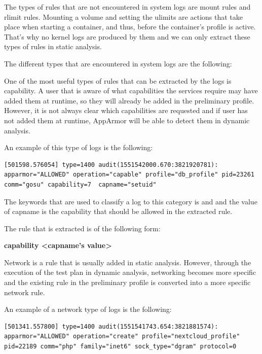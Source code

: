 The types of rules that are not encountered in system logs are mount rules and rlimit rules.  Mounting a volume and setting the ulimits are actions that take place when starting a container, and thus, before the container's profile is active. That's why no kernel logs are produced by them and we can only extract these types of rules in static analysis.

The different types that are encountered in system logs are the following:

\begin{description}[style=nextline]
\item[Capabilities]
One of the most useful types of rules that can be extracted by the logs is capability. A user that is aware of what capabilities the services require may have added them at runtime, so they will already be added in the preliminary profile. However, it is not always clear which capabilities are requested and if user has not added them at runtime, AppArmor will be able to detect them in dynamic analysis.

An example of this type of logs is the following:

\begin{lstlisting}[style=dockercommands]
[501598.576054] type=1400 audit(1551542000.670:3821920781): apparmor="ALLOWED" operation="capable" profile="db_profile" pid=23261 comm="gosu" capability=7  capname="setuid"
\end{lstlisting}

The keywords that are used to classify a log to this category is  and  and the value of capname is the capability that should be allowed in the extracted rule.

The rule that is extracted is of the following form:

\textbf{capability \textless capname's value\textgreater}

\item[Network]
Network is a rule that is usually added in static analysis. However, through the execution of the test plan in dynamic analysis, networking becomes more specific and the existing rule in the preliminary profile is converted into a more specific network rule.

An example of a network type of logs is the following:
\begin{lstlisting}[style=dockercommands]
[501341.557800] type=1400 audit(1551541743.654:3821881574): apparmor="ALLOWED" operation="create" profile="nextcloud_profile" pid=22189 comm="php" family="inet6" sock_type="dgram" protocol=0
\end{lstlisting}


\end{description}
